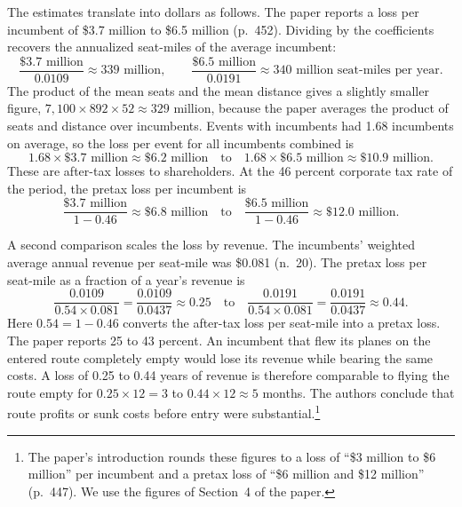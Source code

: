 The estimates translate into dollars as follows. The paper reports a loss per incumbent of \$3.7
million to \$6.5 million (p.~452). Dividing by the coefficients recovers the annualized
seat-miles of the average incumbent:
\begin{equation*}
\frac{\$3.7\text{ million}}{0.0109}\approx 339\text{ million},\qquad
\frac{\$6.5\text{ million}}{0.0191}\approx 340\text{ million seat-miles per year}.
\end{equation*}
The product of the mean seats and the mean distance gives a slightly smaller figure,
$7{,}100\times892\times52\approx329$ million, because the paper averages the product of seats and
distance over incumbents. Events with incumbents had 1.68 incumbents on average, so the loss per event
for all incumbents combined is
\begin{equation*}
1.68\times\$3.7\text{ million}\approx\$6.2\text{ million}\quad\text{to}\quad
1.68\times\$6.5\text{ million}\approx\$10.9\text{ million}.
\end{equation*}
These are after-tax losses to shareholders. At the 46 percent corporate tax rate of the period, the
pretax loss per incumbent is
\begin{equation*}
\frac{\$3.7\text{ million}}{1-0.46}\approx\$6.8\text{ million}\quad\text{to}\quad
\frac{\$6.5\text{ million}}{1-0.46}\approx\$12.0\text{ million}.
\end{equation*}

A second comparison scales the loss by revenue. The incumbents' weighted average annual revenue per
seat-mile was \$0.081 (n.~20). The pretax loss per seat-mile as a fraction of a year's revenue is
\begin{equation*}
\frac{0.0109}{0.54\times0.081}=\frac{0.0109}{0.0437}\approx0.25\quad\text{to}\quad
\frac{0.0191}{0.54\times0.081}=\frac{0.0191}{0.0437}\approx0.44 .
\end{equation*}
Here $0.54=1-0.46$ converts the after-tax loss per seat-mile into a pretax loss.
The paper reports 25 to 43 percent. An incumbent that flew its planes on the entered route completely
empty would lose its revenue while bearing the same costs. A loss of 0.25 to 0.44 years of revenue is
therefore comparable to flying the route empty for $0.25\times12=3$ to $0.44\times12\approx5$ months.
The authors conclude that route profits or sunk costs before entry were substantial.\footnote{The
paper's introduction rounds these figures to a loss of ``\$3 million to \$6 million'' per incumbent and
a pretax loss of ``\$6 million and \$12 million'' (p.~447). We use the figures of Section~4 of
the paper.}

